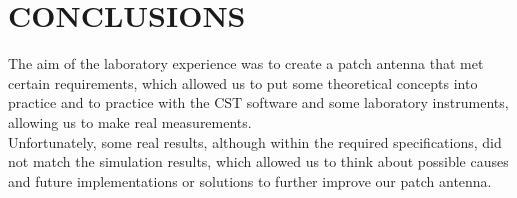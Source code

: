 \documentclass[]{article}
\begin{document}
\section{CONCLUSIONS}
The aim of the laboratory experience was to create a patch antenna that met certain requirements, which allowed us to put some theoretical concepts into practice and to practice with the CST software and some laboratory instruments, allowing us to make real measurements.\\ Unfortunately, some real results, although within the required specifications, did not match the simulation results, which allowed us to think about possible causes and future implementations or solutions to further improve our patch antenna.
\end{document}
